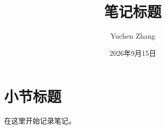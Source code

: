 \documentclass[UTF8, fontset=fandol, a4paper, 12pt]{ctexart}
\title{笔记标题}
\author{Yuchen Zhang}
\date{2026年9月15日}
\begin{document}
\maketitle

\section{小节标题}

在这里开始记录笔记。
\end{document}

